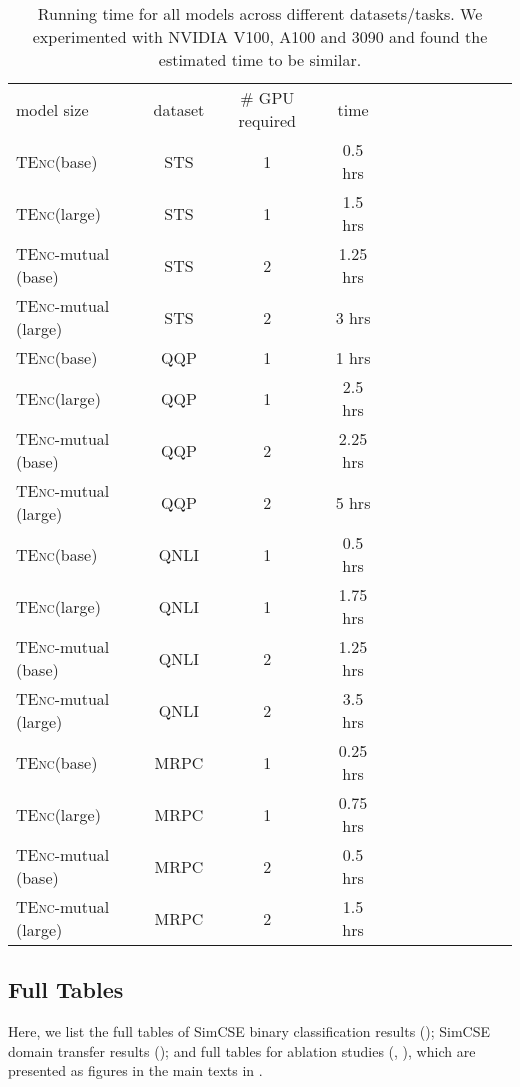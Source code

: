 \documentclass{article} \usepackage{iclr2021_conference,times}
\newcommand{\tenc}{\textsc{TEnc}\xspace}
\begin{document}
\begin{table}[!t] \centering
\small
\begin{tabular}{lccccccccccc}
\cmidrule[1.5pt]{1-10}
  model size & dataset & \# GPU required & time \\
\cmidrule[1.5pt]{1-10}
\tenc (base) & STS & 1 & 0.5 hrs \\
\tenc (large) & STS & 1 & 1.5 hrs \\
\tenc-mutual (base) & STS & 2 & 1.25 hrs \\
\tenc-mutual (large) & STS & 2 & 3 hrs \\
\cmidrule[1.0pt]{1-10}
\tenc (base) & QQP & 1 & 1 hrs \\
\tenc (large) & QQP & 1 & 2.5 hrs \\
\tenc-mutual (base) & QQP & 2 & 2.25 hrs \\
\tenc-mutual (large) & QQP & 2 & 5 hrs  \\
\cmidrule[1.0pt]{1-10}
\tenc (base) & QNLI & 1 & 0.5 hrs \\
\tenc (large) & QNLI & 1 &  1.75 hrs \\
\tenc-mutual (base) & QNLI & 2 & 1.25 hrs \\
\tenc-mutual (large) & QNLI & 2 & 3.5 hrs \\
\cmidrule[1.0pt]{1-10}
\tenc (base) & MRPC & 1 & 0.25 hrs \\
\tenc (large) & MRPC & 1 & 0.75 hrs \\
\tenc-mutual (base) & MRPC & 2 & 0.5 hrs  \\
\tenc-mutual (large) & MRPC & 2 & 1.5 hrs  \\
\cmidrule[1.5pt]{1-10}
\end{tabular}
\caption{Running time for all models across different datasets/tasks. We experimented with NVIDIA V100, A100 and 3090 and found the estimated time to be similar.}
\label{tab:runtime}
\end{table}



\subsection{Full Tables}

Here, we list the full tables of SimCSE binary classification results (); SimCSE domain transfer results (); and full tables for ablation studies (, ), which are presented as figures in the main texts in .
\end{document}
